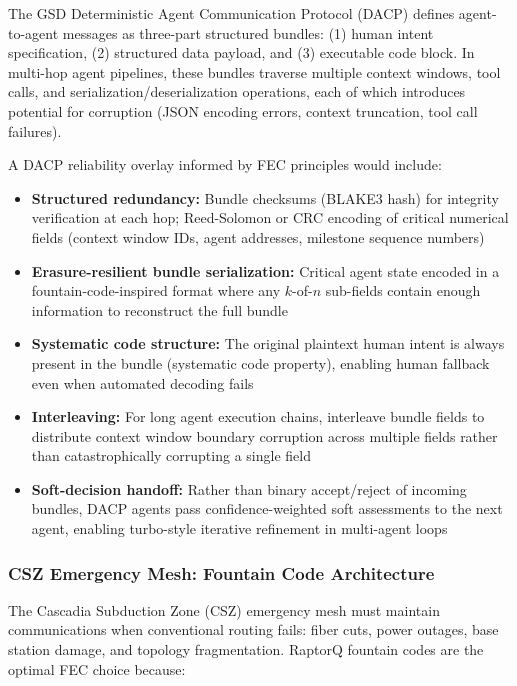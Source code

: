\documentclass[11pt,letterpaper]{article}
\begin{document}
The GSD Deterministic Agent Communication Protocol (DACP) defines agent-to-agent messages as three-part structured bundles: (1) human intent specification, (2) structured data payload, and (3) executable code block. In multi-hop agent pipelines, these bundles traverse multiple context windows, tool calls, and serialization/deserialization operations, each of which introduces potential for corruption (JSON encoding errors, context truncation, tool call failures).

A DACP reliability overlay informed by FEC principles would include:

\begin{itemize}[leftmargin=*]
  \item \textbf{Structured redundancy:} Bundle checksums (BLAKE3 hash) for integrity verification at each hop; Reed-Solomon or CRC encoding of critical numerical fields (context window IDs, agent addresses, milestone sequence numbers)
  \item \textbf{Erasure-resilient bundle serialization:} Critical agent state encoded in a fountain-code-inspired format where any $k$-of-$n$ sub-fields contain enough information to reconstruct the full bundle
  \item \textbf{Systematic code structure:} The original plaintext human intent is always present in the bundle (systematic code property), enabling human fallback even when automated decoding fails
  \item \textbf{Interleaving:} For long agent execution chains, interleave bundle fields to distribute context window boundary corruption across multiple fields rather than catastrophically corrupting a single field
  \item \textbf{Soft-decision handoff:} Rather than binary accept/reject of incoming bundles, DACP agents pass confidence-weighted soft assessments to the next agent, enabling turbo-style iterative refinement in multi-agent loops
\end{itemize}

\subsubsection{CSZ Emergency Mesh: Fountain Code Architecture}

The Cascadia Subduction Zone (CSZ) emergency mesh must maintain communications when conventional routing fails: fiber cuts, power outages, base station damage, and topology fragmentation. RaptorQ fountain codes are the optimal FEC choice because:
\end{document}
